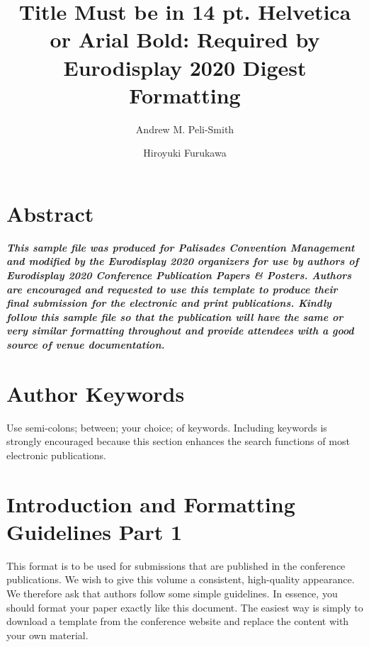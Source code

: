\documentclass[9pt]{extarticle}
\title{
    \vspace{-2em}
    \centering
    \fontsize{14pt}{14pt}
    \bfseries
    \sffamily
    Title Must be in 14 pt. Helvetica or Arial Bold: Required by Eurodisplay 2020 Digest Formatting
    \vspace{-0.3em}
}
\author[*]{Andrew M. Peli-Smith}
\author[**]{Hiroyuki Furukawa\vspace{-0.6em}}
\affil[*]{Schepens Eye Research Institute, Boston MA}
\affil[**]{Sharp Corporation, Osaka, Japan\vspace{-1em}}
\date{} %
\begin{document}
\maketitle

\pagestyle{empty}
\thispagestyle{empty} %

\renewcommand{\baselinestretch}{1} %

\setlength{\parindent}{0cm} %

\setlength\columnsep{1.25cm} %

\begin{multicols}{2} %

\section*{Abstract}

{
\bfseries\itshape
This sample file was produced for Palisades Convention Management and modified by the Eurodisplay 2020 organizers for use by authors of Eurodisplay 2020 Conference Publication Papers \& Posters.
Authors are encouraged and requested to use this template to produce their final submission for the electronic and print publications.
Kindly follow this sample file so that the publication will have the same or very similar formatting throughout and provide attendees with a good source of venue documentation.
}

\section*{Author Keywords}

Use semi-colons; between; your choice; of keywords.
Including keywords is strongly encouraged because this section enhances the search functions of most electronic publications.

\section{Introduction and Formatting Guidelines Part 1}

This format is to be used for submissions that are published in the conference publications.
We wish to give this volume a consistent, high-quality appearance.
We therefore ask that authors follow some simple guidelines.
In essence, you should format your paper exactly like this document.
The easiest way is simply to download a template from the conference website and replace the content with your own material. 


\end{multicols}
\end{document}
